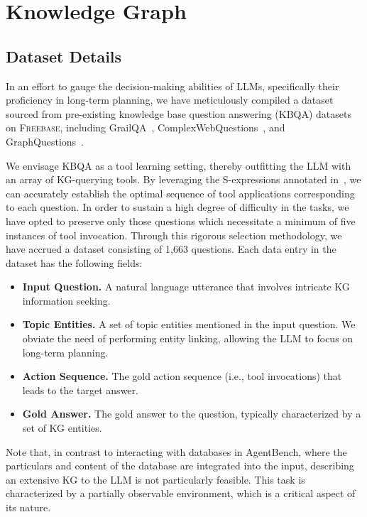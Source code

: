 \section{Knowledge Graph} \label{app:kg}
\subsection{Dataset Details}
In an effort to gauge the decision-making abilities of LLMs, specifically their proficiency in long-term planning, we have meticulously compiled a dataset sourced from pre-existing knowledge base question answering (KBQA) datasets on \textsc{Freebase}, including GrailQA~\citep{grailqa}, ComplexWebQuestions~\citep{complexwebq}, and GraphQuestions~\citep{graphq}.

We envisage KBQA as a tool learning setting, thereby outfitting the LLM with an array of KG-querying tools.
By leveraging the S-expressions annotated in~\citep{gu-su-2022-arcaneqa}, we can accurately establish the optimal sequence of tool applications corresponding to each question.
In order to sustain a high degree of difficulty in the tasks, we have opted to preserve only those questions which necessitate a minimum of five instances of tool invocation.
Through this rigorous selection methodology, we have accrued a dataset consisting of 1,663 questions. Each data entry in the dataset has the following fields:
\begin{itemize}[leftmargin=1.5em,itemsep=0pt,parsep=0.2em,topsep=0.0em,partopsep=0.0em]
\item \textbf{Input Question.} A natural language utterance that involves intricate KG information seeking.
\item \textbf{Topic Entities.} A set of topic entities mentioned in the input question. We obviate the need of performing entity linking, allowing the LLM to focus on long-term planning.
\item \textbf{Action Sequence.} The gold action sequence (i.e., tool invocations) that leads to the target answer.
\item \textbf{Gold Answer.} The gold answer to the question, typically characterized by a set of KG entities.
\end{itemize}
Note that, in contrast to interacting with databases in AgentBench, where the particulars and content of the database are integrated into the input, describing an extensive KG to the LLM is not particularly feasible. 
This task is characterized by a partially observable environment, which is a critical aspect of its nature.

